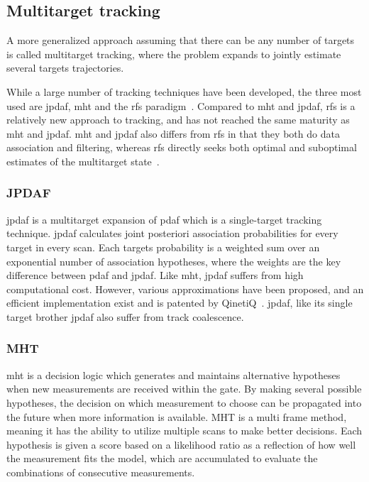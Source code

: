 \subsection{Multitarget tracking}
A more generalized approach assuming that there can be any number of targets is called multitarget tracking, where the problem expands to jointly estimate several targets trajectories.

While a large number of tracking techniques have been developed, the three most used are \gls{jpdaf}, \gls{mht} and the \gls{rfs} paradigm~\cite{Vo2015}. Compared to \gls{mht} and \gls{jpdaf}, \gls{rfs} is a relatively new approach to tracking, and has not reached the same maturity as \gls{mht} and \gls{jpdaf}. \gls{mht} and \gls{jpdaf} also differs from \gls{rfs} in that they both do data association and filtering, whereas \gls{rfs} directly seeks both optimal and suboptimal estimates of the multitarget state~\cite{Vo2015}.

\subsubsection{JPDAF}
\gls{jpdaf} is a multitarget expansion of \gls{pdaf} which is a single-target tracking technique. \Gls{jpdaf} calculates joint posteriori association probabilities for every target in every scan. Each targets probability is a weighted sum over an exponential number of association hypotheses, where the weights are the key difference between \gls{pdaf} and \gls{jpdaf}. Like \gls{mht}, \gls{jpdaf} suffers from high computational cost. However, various approximations have been proposed, and an efficient implementation exist and is patented by QinetiQ~\cite{Horridge}. \Gls{jpdaf}, like its single target brother \gls{jpdaf} also suffer from track \gls{coalescence}. 

\subsubsection{MHT}
\gls{mht} is a decision logic which generates and maintains alternative hypotheses when new \glspl{measurement} are received within the gate. By making several possible hypotheses, the decision on which \gls{measurement} to choose can be propagated into the future when more information is available. MHT is a multi frame method, meaning it has the ability to utilize multiple scans to make better decisions. Each hypothesis is given a \gls{score} based on a likelihood ratio as a reflection of how well the measurement fits the model, which are accumulated to evaluate the combinations of consecutive \glspl{measurement}.

